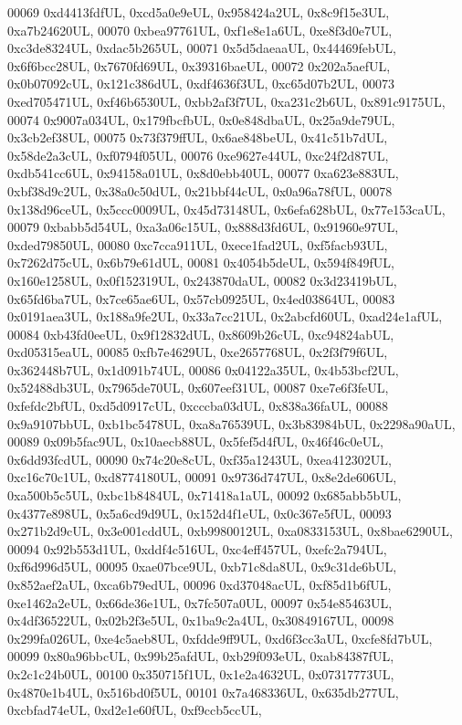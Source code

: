 \begin{DoxyCode}
00069     0xd4413fdfUL, 0xcd5a0e9eUL, 0x958424a2UL, 0x8c9f15e3UL, 0xa7b24620UL,
00070     0xbea97761UL, 0xf1e8e1a6UL, 0xe8f3d0e7UL, 0xc3de8324UL, 0xdac5b265UL,
00071     0x5d5daeaaUL, 0x44469febUL, 0x6f6bcc28UL, 0x7670fd69UL, 0x39316baeUL,
00072     0x202a5aefUL, 0x0b07092cUL, 0x121c386dUL, 0xdf4636f3UL, 0xc65d07b2UL,
00073     0xed705471UL, 0xf46b6530UL, 0xbb2af3f7UL, 0xa231c2b6UL, 0x891c9175UL,
00074     0x9007a034UL, 0x179fbcfbUL, 0x0e848dbaUL, 0x25a9de79UL, 0x3cb2ef38UL,
00075     0x73f379ffUL, 0x6ae848beUL, 0x41c51b7dUL, 0x58de2a3cUL, 0xf0794f05UL,
00076     0xe9627e44UL, 0xc24f2d87UL, 0xdb541cc6UL, 0x94158a01UL, 0x8d0ebb40UL,
00077     0xa623e883UL, 0xbf38d9c2UL, 0x38a0c50dUL, 0x21bbf44cUL, 0x0a96a78fUL,
00078     0x138d96ceUL, 0x5ccc0009UL, 0x45d73148UL, 0x6efa628bUL, 0x77e153caUL,
00079     0xbabb5d54UL, 0xa3a06c15UL, 0x888d3fd6UL, 0x91960e97UL, 0xded79850UL,
00080     0xc7cca911UL, 0xece1fad2UL, 0xf5facb93UL, 0x7262d75cUL, 0x6b79e61dUL,
00081     0x4054b5deUL, 0x594f849fUL, 0x160e1258UL, 0x0f152319UL, 0x243870daUL,
00082     0x3d23419bUL, 0x65fd6ba7UL, 0x7ce65ae6UL, 0x57cb0925UL, 0x4ed03864UL,
00083     0x0191aea3UL, 0x188a9fe2UL, 0x33a7cc21UL, 0x2abcfd60UL, 0xad24e1afUL,
00084     0xb43fd0eeUL, 0x9f12832dUL, 0x8609b26cUL, 0xc94824abUL, 0xd05315eaUL,
00085     0xfb7e4629UL, 0xe2657768UL, 0x2f3f79f6UL, 0x362448b7UL, 0x1d091b74UL,
00086     0x04122a35UL, 0x4b53bcf2UL, 0x52488db3UL, 0x7965de70UL, 0x607eef31UL,
00087     0xe7e6f3feUL, 0xfefdc2bfUL, 0xd5d0917cUL, 0xcccba03dUL, 0x838a36faUL,
00088     0x9a9107bbUL, 0xb1bc5478UL, 0xa8a76539UL, 0x3b83984bUL, 0x2298a90aUL,
00089     0x09b5fac9UL, 0x10aecb88UL, 0x5fef5d4fUL, 0x46f46c0eUL, 0x6dd93fcdUL,
00090     0x74c20e8cUL, 0xf35a1243UL, 0xea412302UL, 0xc16c70c1UL, 0xd8774180UL,
00091     0x9736d747UL, 0x8e2de606UL, 0xa500b5c5UL, 0xbc1b8484UL, 0x71418a1aUL,
00092     0x685abb5bUL, 0x4377e898UL, 0x5a6cd9d9UL, 0x152d4f1eUL, 0x0c367e5fUL,
00093     0x271b2d9cUL, 0x3e001cddUL, 0xb9980012UL, 0xa0833153UL, 0x8bae6290UL,
00094     0x92b553d1UL, 0xddf4c516UL, 0xc4eff457UL, 0xefc2a794UL, 0xf6d996d5UL,
00095     0xae07bce9UL, 0xb71c8da8UL, 0x9c31de6bUL, 0x852aef2aUL, 0xca6b79edUL,
00096     0xd37048acUL, 0xf85d1b6fUL, 0xe1462a2eUL, 0x66de36e1UL, 0x7fc507a0UL,
00097     0x54e85463UL, 0x4df36522UL, 0x02b2f3e5UL, 0x1ba9c2a4UL, 0x30849167UL,
00098     0x299fa026UL, 0xe4c5aeb8UL, 0xfdde9ff9UL, 0xd6f3cc3aUL, 0xcfe8fd7bUL,
00099     0x80a96bbcUL, 0x99b25afdUL, 0xb29f093eUL, 0xab84387fUL, 0x2c1c24b0UL,
00100     0x350715f1UL, 0x1e2a4632UL, 0x07317773UL, 0x4870e1b4UL, 0x516bd0f5UL,
00101     0x7a468336UL, 0x635db277UL, 0xcbfad74eUL, 0xd2e1e60fUL, 0xf9ccb5ccUL,

\end{DoxyCode}
